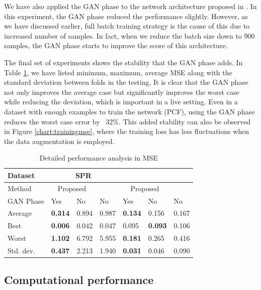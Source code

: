 \documentclass[journal]{IEEEtran}
\begin{document}
We have also applied the GAN phase to the network architecture proposed in \cite{paper0}. In this experiment, the GAN phase reduced the performance slightly. However, as we have discussed earlier, full batch training strategy is the cause of this due to increased number of samples. In fact, when we reduce the batch size down to 900 samples, the GAN phase starts to improve the score of this architecture.

The final set of experiments shows the stability that the GAN phase adds. In Table \ref{tbl:all}, we have listed minimum, maximum, average MSE along with the standard deviation between folds in the testing. It is clear that the GAN phase not only improves the average case but significantly improves the worst case while reducing the deviation, which is important in a live setting. Even in a dataset with enough examples to train the network (PCF), using the GAN phase reduces the worst case error by  32\%. This added stability can also be observed in Figure \ref{chart:trainingmse}, where the training loss has less fluctuations when the data augmentation is employed.

\begin{table}
	\caption{Detailed performance analysis in MSE}
	\centering
	\begin{tabular}{l|l|l|l|l|l|l}
		Dataset & \multicolumn{3}{c|}{SPR} & \multicolumn{3}{c}{\dszero{}} \\\hline
		Method & \multicolumn{2}{c|}{Proposed} & \cite{paper0}  & \multicolumn{2}{c|}{Proposed}   & \cite{paper0} \\\hline
		GAN Phase 			& Yes            & No    &  No     &   Yes            & No             & No    \\\hline
		Average   			& \textbf{0.314} & 0.894 & 0.987   &   \textbf{0.134} & 0.156          & 0.167 \\
		Best      			& \textbf{0.006} & 0.042 & 0.047   &   0.095          & \textbf{0.093} & 0.106 \\
		Worst     			& \textbf{1.102} & 6.792 & 5.955   &   \textbf{0.181} & 0.265          & 0.416 \\
		Std. dev.       	& \textbf{0.437} & 2.213 & 1.940   &   \textbf{0.031} & 0.046          & 0.090 \\
	\end{tabular}
	\label{tbl:all}
\end{table}


\subsection{Computational performance}
\end{document}
